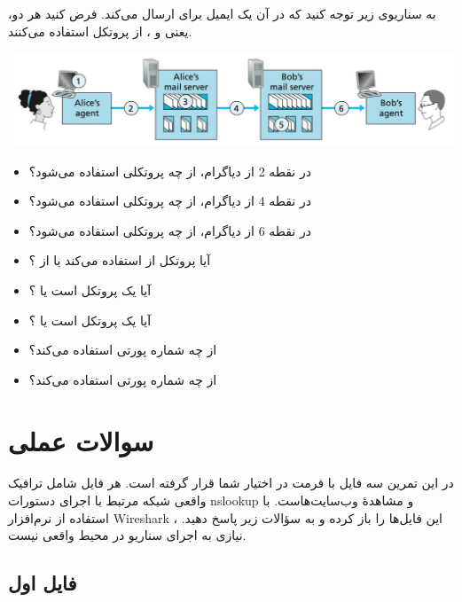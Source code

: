 به سناریوی زیر توجه کنید که در آن  یک ایمیل برای  ارسال می‌کند. فرض کنید هر دو، یعنی  و ، از پروتکل  استفاده می‌کنند.

\begin{center}
	\includegraphics[width=1\linewidth]{images/screenshot004}
\end{center}


\begin{itemize}
	\item در نقطه 2 از دیاگرام، از چه پروتکلی استفاده می‌شود؟
	\item در نقطه 4 از دیاگرام، از چه پروتکلی استفاده می‌شود؟
	\item در نقطه 6 از دیاگرام، از چه پروتکلی استفاده می‌شود؟
	\item آیا پروتکل  از  استفاده می‌کند یا از ؟
	\item آیا  یک پروتکل  است یا ؟
	\item آیا  یک پروتکل  است یا ؟
	\item {} از چه شماره پورتی استفاده می‌کند؟
	\item {} از چه شماره پورتی استفاده می‌کند؟
\end{itemize}

\pagebreak



\section*{سوالات عملی}

در این تمرین سه فایل با فرمت 
 در اختیار شما قرار گرفته است.
هر فایل شامل ترافیک واقعی شبکه مرتبط با اجرای دستورات nslookup و مشاهدهٔ وب‌سایت‌هاست.
با استفاده از نرم‌افزار Wireshark ، این فایل‌ها را باز کرده و به سؤالات زیر پاسخ دهید.
نیازی به اجرای سناریو در محیط واقعی نیست.

\subsection*{فایل اول}

